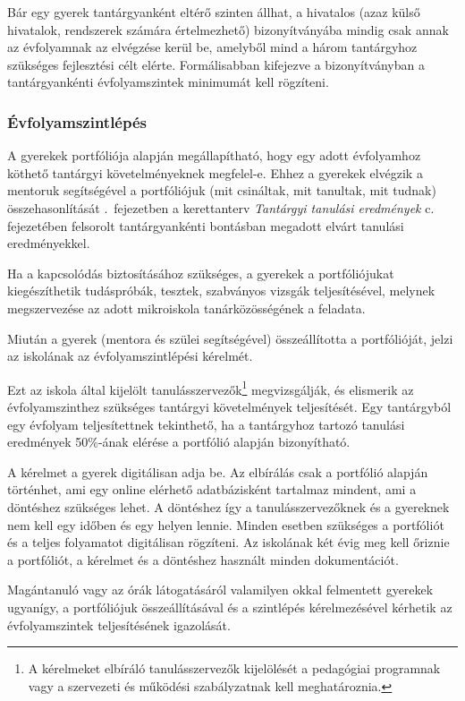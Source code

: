 Bár egy gyerek tantárgyanként eltérő szinten állhat, a hivatalos (azaz külső
hivatalok, rendszerek számára értelmezhető) bizonyítványába mindig csak annak
az évfolyamnak az elvégzése kerül be, amelyből mind a három tantárgyhoz
szükséges fejlesztési célt elérte. Formálisabban kifejezve a bizonyítványban a
tantárgyankénti évfolyamszintek minimumát kell rögzíteni.

\subsubsection{Évfolyamszintlépés}
\label{sec:evfolyamszintlepes}
A gyerekek portfóliója alapján megállapítható, hogy egy adott évfolyamhoz
köthető tantárgyi követelményeknek megfelel-e.
Ehhez a gyerekek elvégzik a mentoruk segítségével a portfóliójuk (mit csináltak,
mit tanultak, mit tudnak) összehasonlítását \ifkerettanterv
      .~fejezetben
\else
      a kerettanterv \emph{Tantárgyi tanulási eredmények} c. fejezetében
\fi
felsorolt tantárgyankénti bontásban megadott elvárt tanulási eredményekkel.

Ha a kapcsolódás biztosításához szükséges, a gyerekek a portfóliójukat
kiegészíthetik tudáspróbák, tesztek, szabványos vizsgák teljesítésével, melynek
megszervezése az adott mikroiskola tanárközösségének a feladata.

Miután a gyerek (mentora és szülei segítségével) összeállította a portfólió\-ját,
jelzi az iskolának az évfolyamszintlépési kérelmét.

Ezt az iskola által kijelölt tanulásszervezők\footnote{A kérelmeket elbíráló
      tanulásszervezők kijelölését a pedagógiai programnak vagy a szervezeti és
      működési szabályzatnak kell meghatároznia.}  
megvizsgálják, és elismerik az
évfolyamszinthez szükséges tantárgyi követelmények teljesítését.
Egy tantárgyból egy évfolyam teljesítettnek tekinthető, ha a tantárgyhoz
tartozó tanulási eredmények 50\%-ának elérése a portfólió alapján bizonyítható.

A kérelmet a gyerek digitálisan adja be.
Az elbírálás csak a portfólió alapján történhet, ami egy
online elérhető adatbázisként tartalmaz mindent, ami a döntéshez szükséges
lehet. A döntéshez így a tanulásszervezőknek és a gyereknek nem
kell egy időben és egy helyen lennie. Minden esetben szükséges a portfóliót és
a teljes folyamatot digitálisan rögzíteni.
Az iskolának két évig meg kell őriznie a portfóliót, a kérelmet és a döntéshez
használt minden dokumentációt.

Magántanuló vagy az órák látogatásáról valamilyen okkal
felmentett gyerekek ugyanígy, a portfóliójuk összeállításával és a szintlépés
kérelmezésével kérhetik az évfolyamszintek teljesítésének igazolását.

